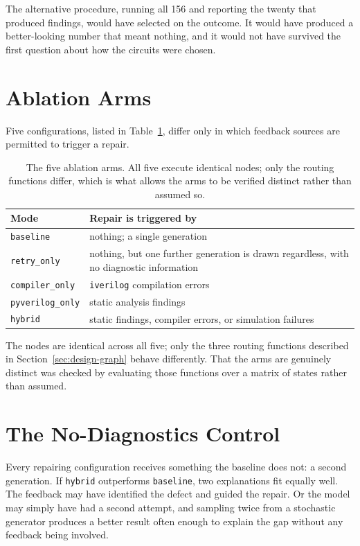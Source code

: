 \documentclass[11pt,a4paper,titlepage=false]{scrreprt}
\begin{document}
The alternative procedure, running all 156 and reporting the twenty that produced findings,
would have selected on the outcome. It would have produced a better-looking number that
meant nothing, and it would not have survived the first question about how the circuits were
chosen.

\section{Ablation Arms}\label{sec:exp-arms}

Five configurations, listed in Table~\ref{tab:arms}, differ only in which feedback sources are
permitted to trigger a repair.

\begin{table}[H]
\centering
\small
\begin{tabular}{@{}l p{9.2cm}@{}}
\toprule
\textbf{Mode} & \textbf{Repair is triggered by} \\
\midrule
\texttt{baseline}        & nothing; a single generation \\
\texttt{retry\_only}     & nothing, but one further generation is drawn regardless, with no diagnostic information \\
\texttt{compiler\_only}  & \texttt{iverilog} compilation errors \\
\texttt{pyverilog\_only} & static analysis findings \\
\texttt{hybrid}          & static findings, compiler errors, or simulation failures \\
\bottomrule
\end{tabular}
\caption{The five ablation arms. All five execute identical nodes; only the routing functions differ, which is what allows the arms to be verified distinct rather than assumed so.}
\label{tab:arms}
\end{table}

The nodes are identical across all five; only the three routing functions described in
Section~\ref{sec:design-graph} behave differently. That the arms are genuinely distinct was
checked by evaluating those functions over a matrix of states rather than assumed.

\section{The No-Diagnostics Control}\label{sec:exp-control}

Every repairing configuration receives something the baseline does not: a second generation.
If \texttt{hybrid} outperforms \texttt{baseline}, two explanations fit equally well. The
feedback may have identified the defect and guided the repair. Or the model may simply have
had a second attempt, and sampling twice from a stochastic generator produces a better
result often enough to explain the gap without any feedback being involved.
\end{document}
